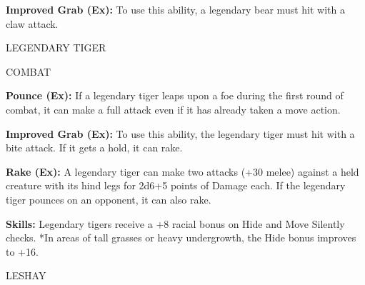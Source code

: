\documentclass{article}
\begin{document}
{\textbf{Improved Grab (Ex): }To use this ability, a legendary bear must hit with 
a claw attack. 

LEGENDARY TIGER 

COMBAT 

\textbf{Pounce (Ex):} If a legendary tiger leaps upon a foe during the first round 
of combat, it can make a full attack even if it has already taken a move action. 

\textbf{Improved Grab (Ex): }To use this ability, the legendary tiger must hit 
with a bite attack. If it gets a hold, it can rake. 

\textbf{Rake (Ex):} A legendary tiger can make two attacks (+30 melee) against 
a held creature with its hind legs for 2d6+5 points of Damage each. If the legendary 
tiger pounces on an opponent, it can also rake. 

\textbf{Skills:} Legendary tigers receive a +8 racial bonus on Hide and Move Silently 
checks. *In areas of tall grasses or heavy undergrowth, the Hide bonus improves 
to +16. 

\vspace{12pt}
{\LARGE{}LESHAY }

}
\end{document}
